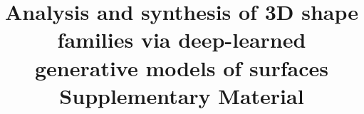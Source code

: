 \documentclass[11pt,a4paper]{article}
\date{}
\begin{document}
\title {Analysis and synthesis of 3D shape families via deep-learned generative models of surfaces \\ Supplementary Material}
\maketitle





\end{document}
